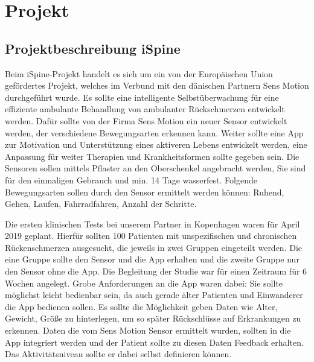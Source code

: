 \chapter{Projekt}
\section{Projektbeschreibung iSpine}\label{beschreibung}
Beim iSpine-Projekt handelt es sich um ein von der Europäischen Union gefördertes Projekt, welches im Verbund mit den dänischen Partnern Sens Motion durchgeführt wurde. Es sollte eine intelligente Selbstüberwachung für eine effiziente ambulante Behandlung von ambulanter Rückschmerzen entwickelt werden. Dafür sollte von der Firma Sens Motion ein neuer Sensor entwickelt werden, der verschiedene Bewegungsarten erkennen kann. Weiter sollte eine App zur Motivation und Unterstützung eines aktiveren Lebens entwickelt werden, eine Anpassung für weiter Therapien und Krankheitsformen sollte gegeben sein. Die Sensoren sollen mittels Pflaster an den Oberschenkel angebracht werden, Sie sind für den einmaligen Gebrauch und min. 14 Tage wasserfest. Folgende  Bewegungsarten sollen durch den Sensor ermittelt werden können: Ruhend, Gehen, Laufen, Fahrradfahren, Anzahl der Schritte. 


Die ersten klinischen Tests bei unserem Partner in Kopenhagen waren für April 2019 geplant. Hierfür sollten 100 Patienten mit unspezifischen und chronischen Rückenschmerzen ausgesucht,  die jeweils in zwei Gruppen eingeteilt werden. Die eine Gruppe sollte den Sensor und die App erhalten und die zweite Gruppe nur den Sensor ohne die App.  Die Begleitung der Studie war für einen Zeitraum für 6 Wochen angelegt. Grobe Anforderungen an die App waren dabei:
Sie sollte möglichst leicht bedienbar sein, da auch gerade älter Patienten und Einwanderer die App bedienen sollen. Es sollte die Möglichkeit geben Daten wie Alter, Gewicht, Größe zu hinterlegen, um so später Rückschlüsse auf Erkrankungen zu erkennen. Daten die vom  Sens Motion Sensor ermittelt wurden, sollten in die App integriert werden und der Patient sollte zu diesen Daten Feedback erhalten. Das Aktivitätsniveau sollte er dabei selbst definieren können.


